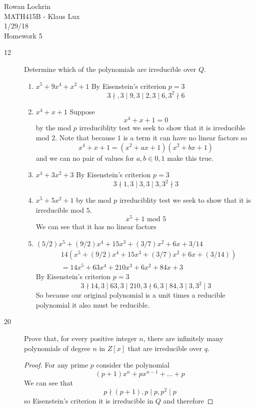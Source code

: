 \documentclass[11pt]{article}
\begin{document}
\begin{flushleft}
	Rowan Lochrin \\
	MATH415B - Klaus Lux \\
	1/29/18 \\
	Homework 5
\end{flushleft}
\begin{description}
	\item[12] Determine which of the polynomials are irreducible over $Q$.
		\begin{enumerate}
			\item $x^5 + 9x^4 + x^2 + 1$
				By Eisenstein's criterion $p=3$
				$$3 \nmid, 3\mid 9, 3 \mid 2, 3\mid 6, 3^2\nmid 6$$
			\item $x^4 + x + 1$
			Suppose
				$$x^4 + x + 1  = 0 $$
				by the mod $p$ irreduciblity test we seek to
				show that it is irreducible mod $2$.
				Note that because $1$ is a term it can have no
				linear factors so
				$$x^4+x+1 = (x^2 + ax + 1)(x^2 + bx +1) $$ 
				and we can no pair of values for $a,b \in {0,1}$
				make this true.
			\item $x^4 + 3x^2 + 3$
				By Eisenstein's criterion $p=3$
				$$ 3 \nmid 1, 3\mid 3, 3 \mid 3, 3^2\nmid 3 $$
			\item $x^5 + 5x^2 + 1 $
				by the mod $p$ irreduciblity test we seek to
				show that it is irreducible mod $5$.
				$$x^5 + 1 \text{ mod } 5$$
				We can see that it has no linear factors
			\item $(5/2)x^5 + (9/2)x^4 + 15x^3 + (3/7)x^2 + 6x + 3/14$
			\begin{align*}
				& 14(x^5 + (9/2)x^4 + 15x^3 + (3/7)x^2 + 6x + (3/14)) \\
				 & =  14x^5 + 63x^4 + 210x^3 + 6x^2 + 84x +3 
			\end{align*}
				By Eisenstein's criterion $p=3$
				$$ 3 \nmid 14, 3\mid 63, 3 \mid 210, 3 \nmid 6,
				3 \mid 84, 3\mid 3, 3^2 \mid 3 $$
				So because our original polynomial is a unit
				times a reducible polynomial it also must be
				reducible.
		\end{enumerate}
	\item[20] Prove that, for every positive integer $n$, there are
		infinitely many polynomials of degree $n$ in $Z[x]$ that are
		irreducible over $q$.\\
		\begin{proof}
		For any prime $p$ consider the polynomial
			$$ (p+1)x^n + px^{n-1} + ... + p $$
		We can see that
			$$ p \nmid (p+1), p\mid p, p^2 \mid p$$
		so Eisenstein's criterion it is irreducible in $Q$ and therefore

\end{proof}
\end{description}
\end{document}
